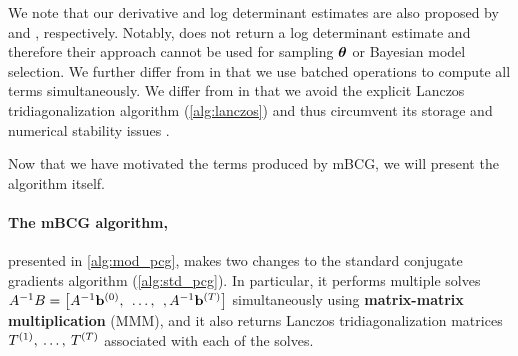 %
We note that our derivative and log determinant estimates are also proposed by \citet{cutajar2016preconditioning} and \citet{dong2017scalable}, respectively.
Notably, \citet{cutajar2016preconditioning} does not return a log determinant estimate and therefore their approach cannot be used for sampling $\boldsymbol{\theta}$ or Bayesian model selection.
We further differ from \citet{cutajar2016preconditioning} in that we use batched operations to compute all terms simultaneously.
We differ from \citet{dong2017scalable} in that we avoid the explicit Lanczos tridiagonalization algorithm (\cref{alg:lanczos}) and thus circumvent its storage and numerical stability issues \cite{golub2012matrix}.

Now that we have motivated the terms produced by mBCG, we will present the algorithm itself.




\paragraph{The mBCG algorithm,} presented in \cref{alg:mod_pcg}, makes two changes to the standard conjugate gradients algorithm (\cref{alg:std_pcg}).
In particular, it performs multiple solves $A^{-1} B = \left[ A^{-1} \mathbf{b}^{(0)}, \:\: \ldots, \:\:, A^{-1} \mathbf{b}^{(T)} \right]$
simultaneously using {\bf matrix-matrix multiplication} (MMM), and it also returns Lanczos tridiagonalization matrices
$T^{(1)}, \: \ldots, \: T^{(T)}$
associated with each of the solves.

